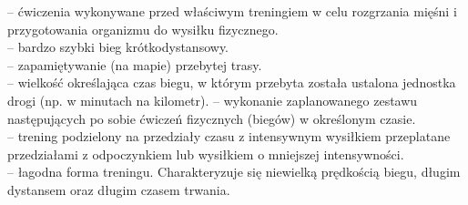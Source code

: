 \begin{multicols}{2}
\begin{description}
	-- ćwiczenia wykonywane przed właściwym treningiem w celu rozgrzania mięśni i przygotowania organizmu do wysiłku fizycznego.\\
	-- bardzo szybki bieg krótkodystansowy.\\
	-- zapamiętywanie (na mapie) przebytej trasy.\\
	-- wielkość określająca czas biegu, w którym przebyta została ustalona jednostka drogi (np. w minutach na kilometr).
	-- wykonanie zaplanowanego zestawu następujących po sobie ćwiczeń fizycznych (biegów) w określonym czasie. \\
	-- trening podzielony na przedziały czasu z intensywnym wysiłkiem przeplatane przedziałami z odpoczynkiem lub wysiłkiem o mniejszej intensywności.\\
	-- łagodna forma treningu. Charakteryzuje się niewielką prędkością biegu, długim dystansem oraz długim czasem trwania.\\
  \end{description}
\end{multicols}

